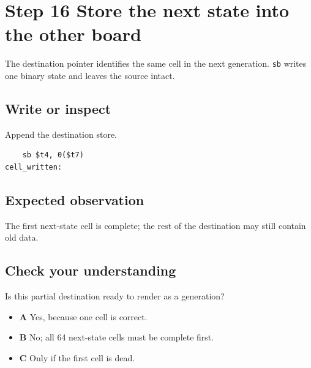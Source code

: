 \section{Step 16 Store the next state into the other
  board}\label{008-life-generations-s16-step-16-store-the-next-state-into-the-other-board}

The destination pointer identifies the same cell in the next generation.
\texttt{sb} writes one binary state and leaves the source intact.

\subsection{Write or
  inspect}\label{008-life-generations-s16-write-or-inspect}

Append the destination store.

\begin{verbatim}
    sb $t4, 0($t7)
cell_written:
\end{verbatim}

\subsection{Expected
  observation}\label{008-life-generations-s16-expected-observation}

The first next-state cell is complete; the rest of the destination may
still contain old data.

\subsection{Check your
  understanding}\label{008-life-generations-s16-check-your-understanding}

Is this partial destination ready to render as a generation?

\begin{itemize}
  \tightlist
  \item
        \textbf{A} Yes, because one cell is correct.
  \item
        \textbf{B} No; all 64 next-state cells must be complete first.
  \item
        \textbf{C} Only if the first cell is dead.
\end{itemize}
